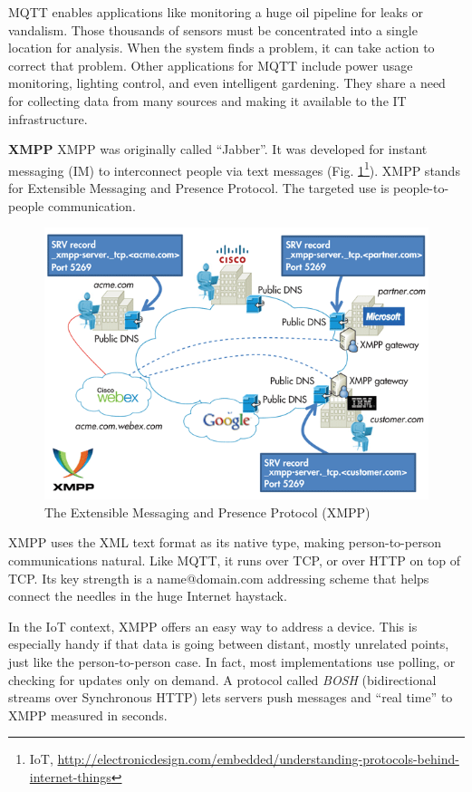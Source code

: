       MQTT enables applications like monitoring a huge oil pipeline for leaks or vandalism. Those thousands of sensors must be concentrated into a single location for analysis. When the system finds a problem, it can take action to correct that problem. Other applications for MQTT include power usage monitoring, lighting control, and even intelligent gardening. They share a need for collecting data from many sources and making it available to the IT infrastructure.

     \textbf{XMPP}
      \newline 
      XMPP was originally called ``Jabber''. It was developed for instant messaging (IM) to interconnect people via text messages (Fig. \ref{img:XMPP}\footnote{IoT, \url{http://electronicdesign.com/embedded/understanding-protocols-behind-internet-things}}). XMPP stands for Extensible Messaging and Presence Protocol. The targeted use is people-to-people communication.
      \begin{figure}[!ht]
      \centering
      \includegraphics[scale=0.7]{images/XMPP.png}   
      \caption[The Extensible Messaging and Presence Protocol (XMPP)]{The Extensible Messaging and Presence Protocol (XMPP)}
      \label{img:XMPP}                           
      \end{figure}
      XMPP uses the XML text format as its native type, making person-to-person communications natural. Like MQTT, it runs over TCP, or over HTTP on top of TCP. Its key strength is a name@domain.com addressing scheme that helps connect the needles in the huge Internet haystack.

      In the IoT context, XMPP offers an easy way to address a device. This is especially handy if that data is going between distant, mostly unrelated points, just like the person-to-person case. In fact, most implementations use polling, or checking for updates only on demand. A protocol called \emph{BOSH} (bidirectional streams over Synchronous HTTP) lets servers push messages and ``real time'' to XMPP measured in seconds.

